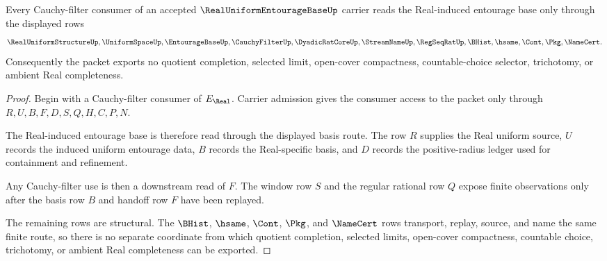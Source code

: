 \begin{theorem}
\label{thm:real-uniform-entourage-base-cauchy-filter-handoff}
Every Cauchy-filter consumer of an accepted $\RealUniformEntourageBaseUp$ carrier reads the Real-induced entourage base only through the displayed rows
$$
\RealUniformStructureUp,\UniformSpaceUp,\EntourageBaseUp,\CauchyFilterUp,\DyadicRatCoreUp,\StreamNameUp,\RegSeqRatUp,\BHist,\hsame,\Cont,\Pkg,\NameCert .
$$
Consequently the packet exports no quotient completion, selected limit, open-cover compactness, countable-choice selector, trichotomy, or ambient Real completeness.
\end{theorem}
\begin{proof}
Begin with a Cauchy-filter consumer of $E_{\Real}$. Carrier admission gives the consumer access to the packet only through $R,U,B,F,D,S,Q,H,C,P,N$.

The Real-induced entourage base is therefore read through the displayed basis route. The row $R$ supplies the Real uniform source, $U$ records the induced uniform entourage data, $B$ records the Real-specific basis, and $D$ records the positive-radius ledger used for containment and refinement.

Any Cauchy-filter use is then a downstream read of $F$. The window row $S$ and the regular rational row $Q$ expose finite observations only after the basis row $B$ and handoff row $F$ have been replayed.

The remaining rows are structural. The $\BHist$, $\hsame$, $\Cont$, $\Pkg$, and $\NameCert$ rows transport, replay, source, and name the same finite route, so there is no separate coordinate from which quotient completion, selected limits, open-cover compactness, countable choice, trichotomy, or ambient Real completeness can be exported.
\end{proof}


